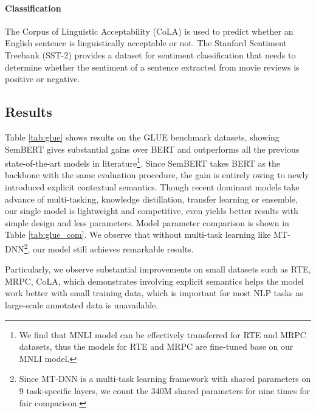 \documentclass[letterpaper]{article} \usepackage{aaai20}  \usepackage{times}  \usepackage{helvet} \usepackage{courier}  \usepackage[hyphens]{url}  \usepackage{graphicx} \urlstyle{rm} \def\UrlFont{\rm}  \usepackage{graphicx}  \frenchspacing  \usepackage{amssymb}
\begin{document}
\paragraph{Classification}
The Corpus of Linguistic Acceptability (CoLA) \cite{warstadt2018neural} is used to predict whether an English sentence is linguistically acceptable or not. The Stanford Sentiment Treebank (SST-2) \cite{socher2013recursive} provides a dataset for sentiment classification that needs to determine whether the sentiment of a sentence extracted from movie reviews is positive or negative.

\subsection{Results} 
Table \ref{tab:glue} shows results on the GLUE benchmark datasets, showing SemBERT gives substantial gains over BERT and outperforms all the previous state-of-the-art models in literature\footnote{We find that MNLI model can be effectively transferred for RTE and MRPC datasets, thus the models for RTE and MRPC are fine-tuned base on our MNLI model.}. Since SemBERT takes BERT as the backbone with the same evaluation procedure, the gain is entirely owing to newly introduced explicit contextual semantics. Though recent dominant models take advance of multi-tasking, knowledge distillation, transfer learning or ensemble, our single model is lightweight and competitive, even yields better results with simple design and less parameters. Model parameter comparison is shown in Table \ref{tab:glue_com}.  We observe that without multi-task learning like MT-DNN\footnote[8]{Since MT-DNN is a multi-task learning framework with shared parameters on 9 task-specific layers, we count the 340M shared parameters for nine times for fair comparison.}, our model still achieves remarkable results. 

Particularly, we observe substantial improvements on small datasets such as RTE, MRPC, CoLA, which demonstrates involving explicit semantics helps the model work better with small training data, which is important for most NLP tasks as large-scale annotated data is unavailable. 
\end{document}
